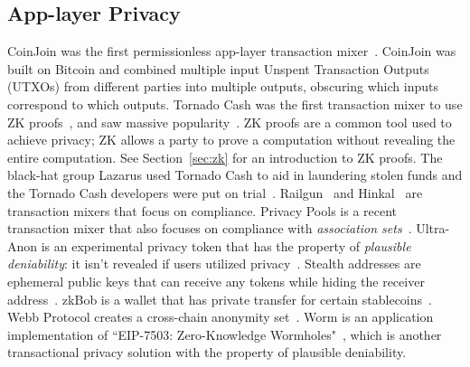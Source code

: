 \documentclass[9pt]{extreport}
\begin{document}
\subsection{App-layer Privacy}
CoinJoin was the first permissionless app-layer transaction mixer~\cite{maxwell2013coinjoin}.  CoinJoin was built on Bitcoin and combined multiple input Unspent Transaction Outputs (UTXOs) from different parties into multiple outputs, obscuring which inputs correspond to which outputs.  Tornado Cash was the first transaction mixer to use ZK proofs~\cite{tornadocash}, and saw massive popularity~\cite{defillama2025tornado}.  ZK proofs are a common tool used to achieve privacy; ZK allows a party to prove a computation without revealing the entire computation.  See Section~\ref{sec:zk} for an introduction to ZK proofs.  The black-hat group Lazarus used Tornado Cash to aid in laundering stolen funds and the Tornado Cash developers were put on trial~\cite{doj_tornado_cash_2023}.  Railgun~\cite{railgun} and Hinkal~\cite{hinkal} are transaction mixers that focus on compliance.  Privacy Pools is a recent transaction mixer that also focuses on compliance with \textit{association sets}~\cite{buterin2023blockchain}.  Ultra-Anon is an experimental privacy token that has the property of \textit{plausible deniability}: it isn't revealed if users utilized privacy~\cite{ultraanon}.  Stealth addresses are ephemeral public keys that can receive any tokens while hiding the receiver address~\cite{buterin2023stealth}.  zkBob is a wallet that has private transfer for certain stablecoins~\cite{zkbob2023overview}.  Webb Protocol creates a cross-chain anonymity set~\cite{webbprotocol}.  Worm is an application implementation of ``EIP-7503: Zero-Knowledge Wormholes"~\cite{7503}, which is another transactional privacy solution with the property of plausible deniability.
\end{document}
